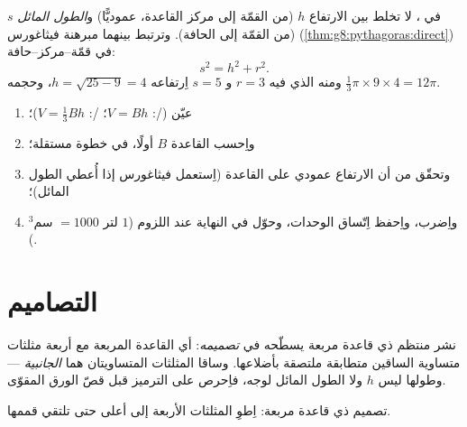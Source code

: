 \begin{example}\label{ex:g8:solids:slant}
في ، لا تخلط بين الارتفاع $h$ (من القمّة إلى مركز
القاعدة، عموديًّا) و\emph{الطول المائل} $s$ (من القمّة إلى
الحافة). وترتبط بينهما مبرهنة فيثاغورس
(\cref{thm:g8:pythagoras:direct}) في 
قمّة--مركز--حافة:
\[
s^2 = h^2 + r^2 .
\]
ومنه  الذي فيه $r = 3$ و $s = 5$ اِرتفاعه
$h = \sqrt{25 - 9} = 4$، وحجمه
$\frac13 \pi \times 9 \times 4 = 12\pi$.
\end{example}

\begin{method}\label{met:g8:solids:method}
\begin{enumerate}
  \item عيّن  (/: $V = Bh$؛ /:
        $V = \frac13 Bh$)؛
  \item واِحسب  القاعدة $B$ أولًا، في خطوة مستقلة؛
  \item وتحقّق من أن الارتفاع عمودي على القاعدة (اِستعمل
        فيثاغورس إذا أُعطي الطول المائل)؛
  \item واِضرب، واِحفظ اِتّساق الوحدات، وحوّل في النهاية عند اللزوم
        ($1$ لتر $= 1000$ سم$^3$).
\end{enumerate}
\end{method}

\section{التصاميم}

\begin{example}\label{ex:g8:solids:net}
نشر  منتظم ذي قاعدة مربعة يسطّحه في
\emph{تصميمه}: أي القاعدة المربعة مع أربعة مثلثات متساوية الساقين متطابقة
ملتصقة بأضلاعها. وساقا المثلثات المتساويتان هما
\emph{ الجانبية}  --- وطولها ليس $h$
ولا الطول المائل لوجه، فاِحرص على الترميز قبل قصّ
الورق المقوّى.
\end{example}

\begin{omfigure}

{\small تصميم  ذي قاعدة مربعة: اِطوِ المثلثات الأربعة إلى أعلى
حتى تلتقي قممها.}
\end{omfigure}

